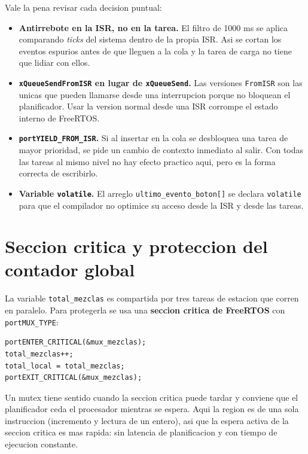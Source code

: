 \documentclass[12pt,a4paper]{article}
\begin{document}
Vale la pena revisar cada decision puntual:

\begin{itemize}
    \item \textbf{Antirrebote en la ISR, no en la tarea.} El filtro de 1000 ms se aplica comparando \textit{ticks} del sistema dentro de la propia ISR. Asi se cortan los eventos espurios antes de que lleguen a la cola y la tarea de carga no tiene que lidiar con ellos.
    \item \textbf{\texttt{xQueueSendFromISR} en lugar de \texttt{xQueueSend}.} Las versiones \texttt{FromISR} son las unicas que pueden llamarse desde una interrupcion porque no bloquean el planificador. Usar la version normal desde una ISR corrompe el estado interno de FreeRTOS.
    \item \textbf{\texttt{portYIELD\_FROM\_ISR}.} Si al insertar en la cola se desbloquea una tarea de mayor prioridad, se pide un cambio de contexto inmediato al salir. Con todas las tareas al mismo nivel no hay efecto practico aqui, pero es la forma correcta de escribirlo.
    \item \textbf{Variable \texttt{volatile}.} El arreglo \texttt{ultimo\_evento\_boton[]} se declara \texttt{volatile} para que el compilador no optimice su acceso desde la ISR y desde las tareas.
\end{itemize}

\section{Seccion critica y proteccion del contador global}

La variable \texttt{total\_mezclas} es compartida por tres tareas de estacion que corren en paralelo. Para protegerla se usa una \textbf{seccion critica de FreeRTOS} con \texttt{portMUX\_TYPE}:

\begin{lstlisting}
portENTER_CRITICAL(&mux_mezclas);
total_mezclas++;
total_local = total_mezclas;
portEXIT_CRITICAL(&mux_mezclas);
\end{lstlisting}

Un mutex tiene sentido cuando la seccion critica puede tardar y conviene que el planificador ceda el procesador mientras se espera. Aqui la region es de una sola instruccion (incremento y lectura de un entero), asi que la espera activa de la seccion critica es mas rapida: sin latencia de planificacion y con tiempo de ejecucion constante.
\end{document}
